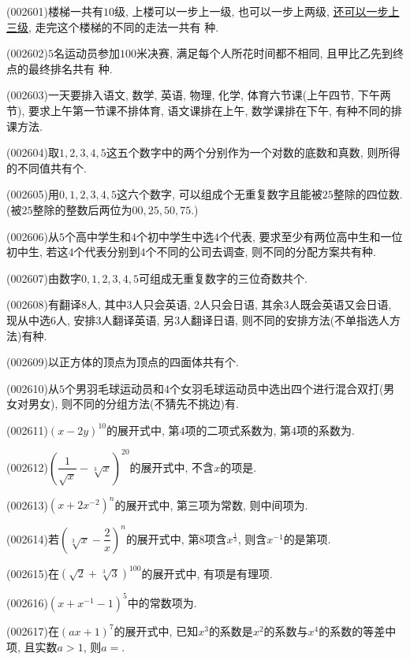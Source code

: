 \item (002601)楼梯一共有$10$级, 上楼可以一步上一级, 也可以一步上两级, \underline{还可以一步上三级}, 走完这个楼梯的不同的走法一共有 种.
\item (002602)$5$名运动员参加$100$米决赛, 满足每个人所花时间都不相同, 且甲比乙先到终点的最终排名共有 种.
\item (002603)一天要排入语文, 数学, 英语, 物理, 化学, 体育六节课(上午四节, 下午两节), 要求上午第一节课不排体育, 语文课排在上午, 数学课排在下午, 有种不同的排课方法.
\item (002604)取$1,2,3,4,5$这五个数字中的两个分别作为一个对数的底数和真数, 则所得的不同值共有个.
\item (002605)用$0,1,2,3,4,5$这六个数字, 可以组成个无重复数字且能被$25$整除的四位数.
(被$25$整除的整数后两位为$00,25,50,75$.)
\item (002606)从$5$个高中学生和$4$个初中学生中选$4$个代表, 要求至少有两位高中生和一位初中生, 若这$4$个代表分别到$4$个不同的公司去调查, 则不同的分配方案共有种.
\item (002607)由数字$0,1,2,3,4,5$可组成无重复数字的三位奇数共个.
\item (002608)有翻译$8$人, 其中$3$人只会英语, $2$人只会日语, 其余$3$人既会英语又会日语, 现从中选$6$人, 安排$3$人翻译英语, 另$3$人翻译日语, 则不同的安排方法(不单指选人方法)有种.
\item (002609)以正方体的顶点为顶点的四面体共有个.
\item (002610)从$5$个男羽毛球运动员和$4$个女羽毛球运动员中选出四个进行混合双打(男女对男女), 则不同的分组方法(不猜先不挑边)有.
\item (002611)$(x-2y)^{10}$的展开式中, 第$4$项的二项式系数为, 第$4$项的系数为.
\item (002612)$\left(\dfrac{1}{\sqrt{x}}-\sqrt[3]{x}\right)^{20}$的展开式中, 不含$x$的项是.
\item (002613)$\left(x+2x^{-2}\right)^n$的展开式中, 第三项为常数, 则中间项为.
\item (002614)若$\left(\sqrt[3]{x}-\dfrac{2}{x}\right)^{n}$的展开式中, 第$8$项含$x^{\frac{1}{3}}$,
则含$x^{-1}$的是第项.
\item (002615)在$\left(\sqrt{2}+\sqrt[3]{3}\right)^{100}$的展开式中, 有项是有理项.
\item (002616)$\left(x+x^{-1}-1\right)^5$中的常数项为.
\item (002617)在$(ax+1)^7$的展开式中, 已知$x^3$的系数是$x^2$的系数与$x^4$的系数的等差中项, 且实数$a>1$, 则$a=$.
